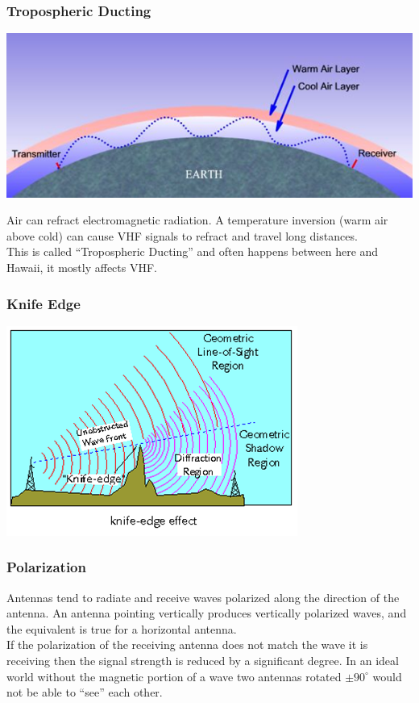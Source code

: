 \documentclass[10pt]{beamer}
\begin{document}
\begin{frame}
\frametitle{Tropospheric Ducting}
\begin{center}
\includegraphics[width=\textwidth]{troposhpere.png}
\end{center}
Air can refract electromagnetic radiation. A temperature inversion (warm air above cold) can cause VHF signals to refract and travel long distances.\\
This is called ``Tropospheric Ducting'' and often happens between here and Hawaii, it mostly affects VHF.
\end{frame}

\begin{frame}
\frametitle{Knife Edge}
\begin{center}
\includegraphics[height=.9\textheight]{knifeedge.png}
\end{center}
\end{frame}

\begin{frame}
\frametitle{Polarization}
Antennas tend to radiate and receive waves polarized along the direction of the antenna. An antenna pointing vertically produces vertically polarized waves, and the equivalent is true for a horizontal antenna.\\
If the polarization of the receiving antenna does not match the wave it is receiving then the signal strength is reduced by a significant degree. In an ideal world without the magnetic portion of a wave two antennas rotated $\pm90^{\circ}$ would not be able to ``see'' each other.
\end{frame}
\end{document}
